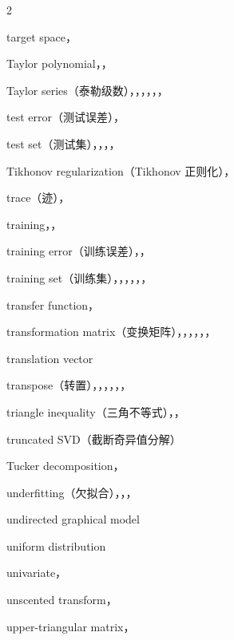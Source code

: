 \begin{multicols}{2}
\medskip{}\par\smallskip
\noindent target space，\par
\noindent Taylor polynomial，，\par
\noindent Taylor series（泰勒级数），，，，，，\par
\noindent test error（测试误差），\par
\noindent test set（测试集），，，，\par
\noindent Tikhonov regularization（Tikhonov 正则化），\par
\noindent trace（迹），\par
\noindent training，，\par
\noindent training error（训练误差），，\par
\noindent training set（训练集），，，，，，\par
\noindent transfer function，\par
\noindent transformation matrix（变换矩阵），，，，，，\par
\noindent translation vector\par
\noindent transpose（转置），，，，，，\par
\noindent triangle inequality（三角不等式），，\par
\noindent truncated SVD（截断奇异值分解）\par
\noindent Tucker decomposition，\par

\medskip{}\par\smallskip
\noindent underfitting（欠拟合），，，\par
\noindent undirected graphical model\par
\noindent uniform distribution\par
\noindent univariate，\par
\noindent unscented transform，\par
\noindent upper-triangular matrix，\par


\end{multicols}
